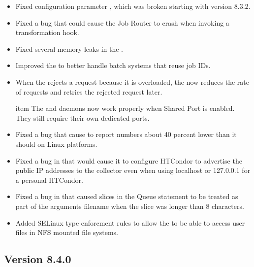 \begin{itemize}
\item Fixed configuration parameter , which was
broken starting with version 8.3.2.

\item Fixed a bug that could cause the Job Router to crash when
invoking a transformation hook.

\item Fixed several memory leaks in the .

\item Improved the  to better handle batch systems
that reuse job IDs.

\item When the  rejects a request because it is
overloaded, the  now reduces the rate of requests
and retries the rejected request later.

item The  and  daemons now work properly
when Shared Port is enabled. They still require their own dedicated ports.

\item Fixed a bug that cause  to report numbers about 40 percent lower than it should
on Linux platforms.

\item Fixed a bug in  that would cause it to configure HTCondor to advertise the public
IP addresses to the collector even when using localhost or 127.0.0.1 for a personal HTCondor.

\item Fixed a bug in  that caused slices in the Queue statement to be treated as part of the
arguments filename when the slice was longer than 8 characters.

\item Added SELinux type enforcment rules to allow the  to be
able to access user files in NFS mounted file systems.
\end{itemize}

\subsection*{\label{sec:New-8-4-0}Version 8.4.0}

